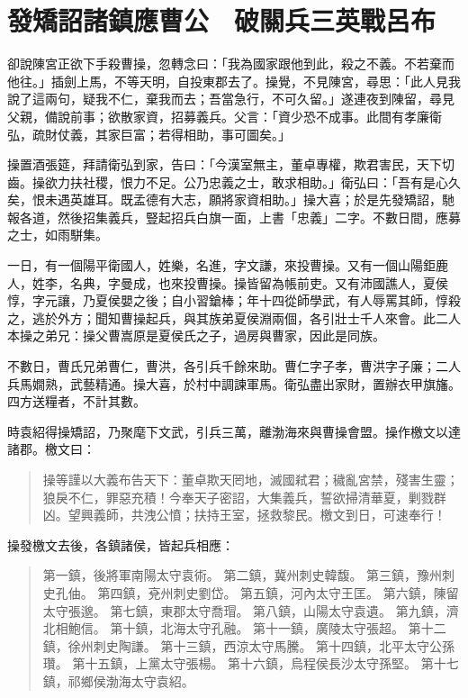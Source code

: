 
\chapter{發矯詔諸鎮應曹公　破關兵三英戰呂布}

卻說陳宮正欲下手殺曹操，忽轉念曰：「我為國家跟他到此，殺之不義。不若棄而他往。」插劍上馬，不等天明，自投東郡去了。操覺，不見陳宮，尋思：「此人見我說了這兩句，疑我不仁，棄我而去；吾當急行，不可久留。」遂連夜到陳留，尋見父親，備說前事；欲散家資，招募義兵。父言：「資少恐不成事。此間有孝廉衛弘，疏財仗義，其家巨富；若得相助，事可圖矣。」

操置酒張筵，拜請衛弘到家，告曰：「今漢室無主，董卓專權，欺君害民，天下切齒。操欲力扶社稷，恨力不足。公乃忠義之士，敢求相助。」衛弘曰：「吾有是心久矣，恨未遇英雄耳。既孟德有大志，願將家資相助。」操大喜；於是先發矯詔，馳報各道，然後招集義兵，豎起招兵白旗一面，上書「忠義」二字。不數日間，應募之士，如雨駢集。

一日，有一個陽平衛國人，姓樂，名進，字文謙，來投曹操。又有一個山陽鉅鹿人，姓李，名典，字曼成，也來投曹操。操皆留為帳前吏。又有沛國譙人，夏侯惇，字元讓，乃夏侯嬰之後；自小習鎗棒；年十四從師學武，有人辱罵其師，惇殺之，逃於外方；聞知曹操起兵，與其族弟夏侯淵兩個，各引壯士千人來會。此二人本操之弟兄：操父曹嵩原是夏侯氏之子，過房與曹家，因此是同族。

不數日，曹氏兄弟曹仁，曹洪，各引兵千餘來助。曹仁字子孝，曹洪字子廉；二人兵馬嫺熟，武藝精通。操大喜，於村中調諫軍馬。衛弘盡出家財，置辦衣甲旗旛。四方送糧者，不計其數。

時袁紹得操矯詔，乃聚麾下文武，引兵三萬，離渤海來與曹操會盟。操作檄文以達諸郡。檄文曰：

\begin{quote}
操等謹以大義布告天下：董卓欺天罔地，滅國弒君；穢亂宮禁，殘害生靈；狼戾不仁，罪惡充積！今奉天子密詔，大集義兵，誓欲掃清華夏，剿戮群凶。望興義師，共洩公憤；扶持王室，拯救黎民。檄文到日，可速奉行！
\end{quote}

操發檄文去後，各鎮諸侯，皆起兵相應：

\begin{quote}
第一鎮，後將軍南陽太守袁術。
第二鎮，冀州刺史韓馥。
第三鎮，豫州刺史孔伷。
第四鎮，兗州刺史劉岱。
第五鎮，河內太守王匡。
第六鎮，陳留太守張邈。
第七鎮，東郡太守喬瑁。
第八鎮，山陽太守袁遺。
第九鎮，濟北相鮑信。
第十鎮，北海太守孔融。
第十一鎮，廣陵太守張超。
第十二鎮，徐州刺史陶謙。
第十三鎮，西涼太守馬騰。
第十四鎮，北平太守公孫瓚。
第十五鎮，上黨太守張楊。
第十六鎮，烏程侯長沙太守孫堅。
第十七鎮，祁鄉侯渤海太守袁紹。
\end{quote}

